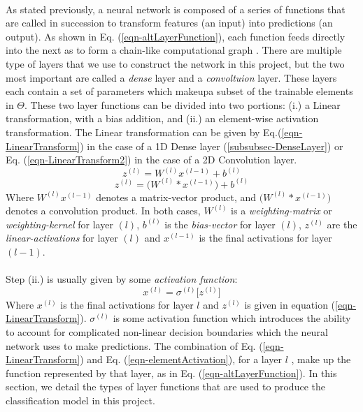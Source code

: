 \documentclass[12pt,letterpaper]{article}
\begin{document}
\paragraph*{}As stated previously, a neural network is composed of a series of functions that are called in succession to transform features (an input) into predictions (an output). As shown in Eq. (\ref{eqn-altLayerFunction}), each function feeds directly into the next as to form a chain-like computational graph \cite{Goodfellow}. There are multiple type of layers that we use to construct the network in this project, but the two most important are called a \textit{dense} layer and a \textit{convoltuion} layer. These layers each contain a set of parameters which makeupa  subset of the trainable elements in $\Theta$.
These two layer functions can be divided into two portions: (i.) a Linear transformation, with a bias addition, and (ii.) an element-wise activation transformation. The Linear transformation can be given by Eq.(\ref{eqn-LinearTransform}) in the case of a 1D Dense layer (\ref{subsubsec-DenseLayer}) or Eq. (\ref{eqn-LinearTransform2}) in the case of a 2D Convolution layer.
\begin{equation}
\label{eqn-LinearTransform}
z^{(l)} = W^{(l)} x^{(l-1)} + b^{(l)}
\end{equation}
\begin{equation}
\label{eqn-LinearTransform2}
z^{(l)} = \big(W^{(l)} * x^{(l-1)}\big) + b^{(l)}
\end{equation} 
Where $W^{(l)} x^{(l-1)}$ denotes a matrix-vector product, and $\big(W^{(l)} * x^{(l-1)}\big)$ denotes a convolution product. In both cases, $W^{(l)}$ is a \textit{weighting-matrix} or \textit{weighting-kernel} for layer $(l)$, $b^{(l)}$ is the \textit{bias-vector} for layer $(l)$, $z^{(l)}$ are the \textit{linear-activations} for layer $(l)$ and $x^{(l-1)}$ is the final activations for layer $(l-1)$.

\paragraph*{}Step (ii.) is usually given by some \textit{activation function}:
\begin{equation}
\label{eqn-elementActivation}
x^{(l)} = \sigma^{(l)} \big[ z^{(l)} \big]
\end{equation}
Where $x^{(l)}$ is the final activations for layer $l$ and $z^{(l)}$ is given in equation (\ref{eqn-LinearTransform}). $\sigma^{(l)}$ is some activation function which introduces the ability to account for complicated non-linear decision boundaries which the neural network uses to make predictions. The combination of Eq. (\ref{eqn-LinearTransform}) and Eq. (\ref{eqn-elementActivation}), for a layer $l$ , make up the function represented by that layer, as in Eq. (\ref{eqn-altLayerFunction}). In this section, we detail the types of layer functions that are used to produce the classification model in this project.
\end{document}
